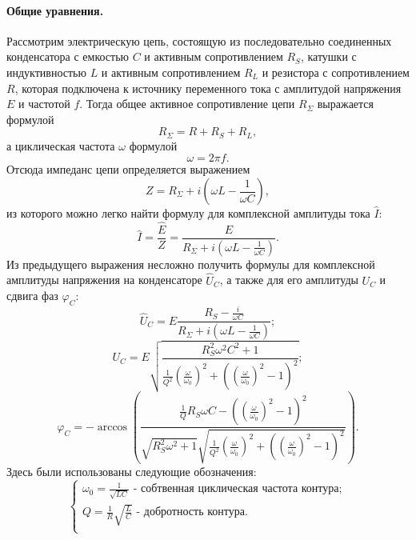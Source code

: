 \documentclass[12pt,a4paper]{article}
\begin{document}
\paragraph{Общие уравнения.} Рассмотрим электрическую цепь, состоящую из последовательно соединенных конденсатора с емкостью $C$ и активным сопротивлением $R_S$, катушки с индуктивностью $L$ и активным сопротивлением $R_L$ и резистора с сопротивлением $R$, которая подключена к источнику переменного тока с амплитудой напряжения $E$ и частотой $f$. Тогда общее активное сопротивление цепи $R_\Sigma$ выражается формулой
\begin{equation}
R_\Sigma = R + R_S + R_L\label{rsum},
\end{equation}
а циклическая частота $\omega$ формулой
 \begin{equation}
\omega = 2\pi f\label{omeg}.
\end{equation}
Отсюда импеданс цепи определяется выражением
\begin{equation}
Z = R_\Sigma + i\left(\omega L - \frac{1}{\omega C}\right)\label{imp},
\end{equation}
из которого можно легко найти формулу для комплексной амплитуды тока $\widehat{I}$:
\begin{equation}
\widehat{I} = \frac{\widehat{E}}{Z} = \frac{E}{R_\Sigma + i\left(\omega L - \frac{1}{\omega C}\right)}\label{Ic}.
\end{equation}
Из предыдущего выражения несложно получить формулы для комплексной амплитуды напряжения на конденсаторе $\widehat{U}_C$, а также для его амплитуды $U_C$ и сдвига фаз $\varphi_C$:
\begin{equation}
\widehat{U}_C = E\frac{R_S - \frac{i}{\omega C}}{R_\Sigma + i\left(\omega L - \frac{1}{\omega C}\right)}\label{ucc};
\end{equation}
\begin{equation}
U_C = E\sqrt{\frac{R_S^2\omega^2C^2+1}{\frac{1}{Q^2}\left(\frac{\omega}{\omega_0}\right)^2 + \left(\left(\frac{\omega}{\omega_0}\right)^2-1\right)^2}}\label{uc};
\end{equation}
\begin{equation}
\varphi_C = -\arccos\left(\frac{\frac{1}{Q}R_S\omega C - \left(\left(\frac{\omega}{\omega_0}\right)^2-1\right)^2}{\sqrt{R_S^2\omega^2+1}\sqrt{\frac{1}{Q^2}\left(\frac{\omega}{\omega_0}\right)^2 + \left(\left(\frac{\omega}{\omega_0}\right)^2-1\right)^2}}\right)\label{phic}.
\end{equation}
Здесь были использованы следующие обозначения:
\begin{equation}
\begin{cases}
\omega_0 = \frac{1}{\sqrt{LC}}\text{ - собтвенная циклическая частота контура};\\
Q = \frac{1}{R}\sqrt{\frac{L}{C}}\text{ - добротность контура}.\\ 
\end{cases}\label{redef}
\end{equation}
\end{document}

